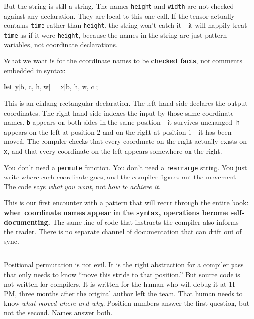 \documentclass[11pt,]{article}
\newenvironment{Shaded}{}{}
\newcommand{\KeywordTok}[1]{\textcolor[rgb]{0.00,0.44,0.13}{\textbf{#1}}}
\newcommand{\NormalTok}[1]{#1}
\newcommand{\OperatorTok}[1]{\textcolor[rgb]{0.40,0.40,0.40}{#1}}
\begin{document}
But the string is still a string. The names \texttt{height} and
\texttt{width} are not checked against any declaration. They are local
to this one call. If the tensor actually contains \texttt{time} rather
than \texttt{height}, the string won't catch it---it will happily treat
\texttt{time} as if it were \texttt{height}, because the names in the
string are just pattern variables, not coordinate declarations.

What we want is for the coordinate names to be \textbf{checked facts},
not comments embedded in syntax:

\begin{Shaded}
\begin{Highlighting}[]
\KeywordTok{let}\NormalTok{ y}\OperatorTok{[}\NormalTok{b, c, h, w}\OperatorTok{]}\NormalTok{ = x}\OperatorTok{[}\NormalTok{b, h, w, c}\OperatorTok{]}\NormalTok{;}
\end{Highlighting}
\end{Shaded}

This is an einlang rectangular declaration. The left-hand side declares
the output coordinates. The right-hand side indexes the input by those
same coordinate names. \texttt{b} appears on both sides in the same
position---it survives unchanged. \texttt{h} appears on the left at
position 2 and on the right at position 1---it has been moved. The
compiler checks that every coordinate on the right actually exists on
\texttt{x}, and that every coordinate on the left appears somewhere on
the right.

You don't need a \texttt{permute} function. You don't need a
\texttt{rearrange} string. You just write where each coordinate goes,
and the compiler figures out the movement. The code says \emph{what you
want}, not \emph{how to achieve it}.

This is our first encounter with a pattern that will recur through the
entire book: \textbf{when coordinate names appear in the syntax,
operations become self-documenting.} The same line of code that
instructs the compiler also informs the reader. There is no separate
channel of documentation that can drift out of sync.

\begin{center}\rule{0.5\linewidth}{0.4pt}\end{center}

Positional permutation is not evil. It is the right abstraction for a
compiler pass that only needs to know ``move this stride to that
position.'' But source code is not written for compilers. It is written
for the human who will debug it at 11 PM, three months after the
original author left the team. That human needs to know \emph{what moved
where and why}. Position numbers answer the first question, but not the
second. Names answer both.
\end{document}
